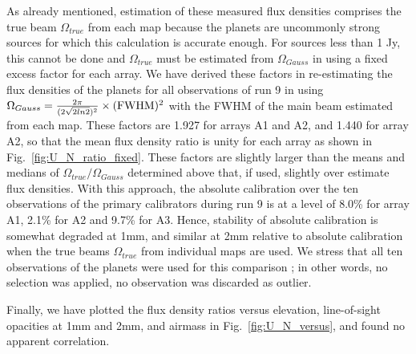As already mentioned, estimation of these measured flux densities comprises  the true beam $\Omega_{true}$ from each map
because the planets  are uncommonly  strong sources for which this calculation is accurate enough.
For sources less than 1 Jy, this cannot be done and $\Omega_{true}$ must be estimated from $\Omega_{Gauss}$
in using a fixed excess factor for each array. We have derived these factors in re-estimating 
the flux densities of the planets for all observations of run 9 in  using  $\Omega_{Gauss}= {2 \pi \over (2 \sqrt{2 ln 2})^2} \times (\rm FWHM)^2$
with the FWHM of the main beam estimated from each map.  These 
factors are  1.927 for arrays A1 and A2, and 1.440 for array A2, so that the mean flux density ratio is unity for each array  as
shown in Fig.~\ref{fig:U_N_ratio_fixed}. These factors are slightly larger than the means and medians of $\Omega_{true}/\Omega_{Gauss}$
determined above that, if used, slightly over estimate flux densities. With this approach,
the absolute calibration over the ten observations of the primary calibrators
during run 9 is at a level of  8.0\% for array A1,  2.1\% for A2 and  9.7\% for A3. Hence, stability of absolute calibration
is somewhat degraded at 1mm, and similar at 2mm
relative to absolute calibration when the true beams $\Omega_{true}$ from individual maps are used. We stress that all ten observations
of the planets were used for this comparison ; in other words, no selection was applied, no observation was discarded as outlier.

Finally, we have plotted the flux density ratios versus elevation, line-of-sight opacities at 1mm and 2mm, and airmass
in Fig.~\ref{fig:U_N_versus}, and found no apparent correlation.




